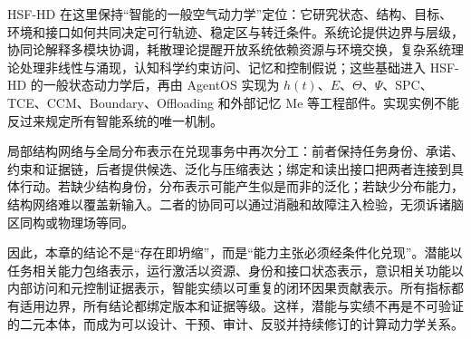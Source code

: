 HSF-HD 在这里保持“智能的一般空气动力学”定位：它研究状态、结构、目标、环境和接口如何共同决定可行轨迹、稳定区与转迁条件。系统论提供边界与层级，协同论解释多模块协调，耗散理论提醒开放系统依赖资源与环境交换，复杂系统理论处理非线性与涌现，认知科学约束访问、记忆和控制假说；这些基础进入 HSF-HD 的一般状态动力学后，再由 AgentOS 实现为 $h(t)$、$E$、$\Theta$、$\Psi$、SPC、TCE、CCM、Boundary、Offloading 和外部记忆 $\mathrm{Me}$ 等工程部件。实现实例不能反过来规定所有智能系统的唯一机制。

局部结构网络与全局分布表示在兑现事务中再次分工：前者保持任务身份、承诺、约束和证据链，后者提供候选、泛化与压缩表达；绑定和读出接口把两者连接到具体行动。若缺少结构身份，分布表示可能产生似是而非的泛化；若缺少分布能力，结构网络难以覆盖新输入。二者的协同可以通过消融和故障注入检验，无须诉诸脑区同构或物理场等同。

因此，本章的结论不是“存在即坍缩”，而是“能力主张必须经条件化兑现”。潜能以任务相关能力包络表示，运行激活以资源、身份和接口状态表示，意识相关功能以内部访问和元控制证据表示，智能实绩以可重复的闭环因果贡献表示。所有指标都有适用边界，所有结论都绑定版本和证据等级。这样，潜能与实绩不再是不可验证的二元本体，而成为可以设计、干预、审计、反驳并持续修订的计算动力学关系。
